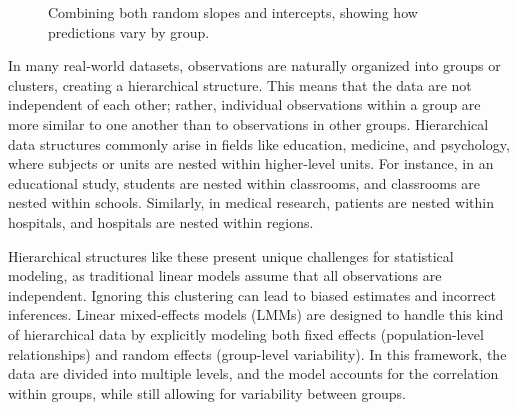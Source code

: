 \begin{figure}[ht]
\centering
{}
\caption{Combining both random slopes and intercepts, showing how predictions vary by group.}
\end{figure}


In many real-world datasets, observations are naturally organized into groups or clusters, creating a hierarchical structure. This means that the data are not independent of each other; rather, individual observations within a group are more similar to one another than to observations in other groups. Hierarchical data structures commonly arise in fields like education, medicine, and psychology, where subjects or units are nested within higher-level units. For instance, in an educational study, students are nested within classrooms, and classrooms are nested within schools. Similarly, in medical research, patients are nested within hospitals, and hospitals are nested within regions.

Hierarchical structures like these present unique challenges for statistical modeling, as traditional linear models assume that all observations are independent. Ignoring this clustering can lead to biased estimates and incorrect inferences. Linear mixed-effects models (LMMs) are designed to handle this kind of hierarchical data by explicitly modeling both fixed effects (population-level relationships) and random effects (group-level variability). In this framework, the data are divided into multiple levels, and the model accounts for the correlation within groups, while still allowing for variability between groups.

